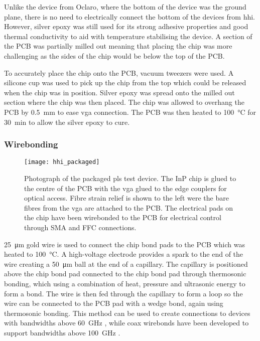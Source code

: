Unlike the device from Oclaro, where the bottom of the device was the ground plane, there is no need to electrically connect the bottom of the devices from \ac{hhi}. However, silver epoxy was still used for its strong adhesive properties and good thermal conductivity to aid with temperature stabilising the device. A section of the PCB was partially milled out meaning that placing the chip was more challenging as the sides of the chip would be below the top of the PCB.

To accurately place the chip onto the PCB, vacuum tweezers were used. A silicone cup was used to pick up the chip from the top which could be released when the chip was in position. Silver epoxy was spread onto the milled out section where the chip was then placed. The chip was allowed to overhang the PCB by \SI{0.5}{\mm} to ease \ac{vga} connection. The PCB was then heated to \SI{100}{\celsius} for \SI{30}{\minute} to allow the silver epoxy to cure.


\subsubsection*{Wirebonding}

\begin{figure}[t]
	\centering
	\texttt{[image: hhi\_packaged]}
	\caption[Photograph of packaged PLS test transmitter]{Photograph of the packaged \ac{pls} test device. The \acs{InP} chip is glued to the centre of the PCB with the \acs{vga} glued to the edge couplers for optical access. Fibre strain relief is shown to the left were the bare fibres from the \acs{vga} are attached to the PCB. The electrical pads on the chip have been wirebonded to the PCB for electrical control through SMA and FFC connections.}
	\label{fig:hhi_photo}
\end{figure}

\SI{25}{\um} gold wire is used to connect the chip bond pads to the PCB which was heated to \SI{100}{\celsius}. A high-voltage electrode provides a spark to the end of the wire creating a \SI{50}{\um} ball at the end of a capillary. The capillary is positioned above the chip bond pad connected to the chip bond pad through thermosonic bonding, which using a combination of heat, pressure and ultrasonic energy to form a bond. The wire is then fed through the capillary to form a loop so the wire can be connected to the PCB pad with a wedge bond, again using thermosonic bonding. This method can be used to create connections to devices with bandwidths above \SI{60}{GHz} \cite{chen2015bandwidth}, while coax wirebonds have been developed to support bandwidths above \SI{100}{GHz} \cite{cahill2006development}.

